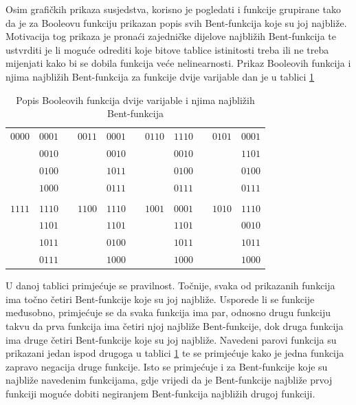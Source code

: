 Osim grafičkih prikaza susjedstva, korisno je pogledati i funkcije grupirane tako da je za Booleovu funkciju prikazan popis svih Bent-funkcija koje su joj najbliže.
Motivacija tog prikaza je pronaći zajedničke dijelove najbližih Bent-funkcija te ustvrditi je li moguće odrediti koje bitove tablice istinitosti treba ili ne treba mijenjati kako bi se dobila funkcija veće nelinearnosti.
Prikaz Booleovih funkcija i njima najbližih Bent-funkcija za funkcije dvije varijable dan je u tablici \ref{tbl:neighbor}
\begin{table}[]
\centering
\begin{tabular}{ccccccccccc}
$0000$ & $0001$ &  & $0011$ & $0001$ &  & $0110$ & $1110$ &  & $0101$ & $0001$ \\
       & $0010$ &  &        & $0010$ &  &        & $0010$ &  &        & $1101$ \\
       & $0100$ &  &        & $1011$ &  &        & $0100$ &  &        & $0100$ \\
       & $1000$ &  &        & $0111$ &  &        & $0111$ &  &        & $0111$ \\
       &        &  &        &        &  &        &        &  &        &        \\
$1111$ & $1110$ &  & $1100$ & $1110$ &  & $1001$ & $0001$ &  & $1010$ & $1110$ \\
       & $1101$ &  &        & $1101$ &  &        & $1101$ &  &        & $0010$ \\
       & $1011$ &  &        & $0100$ &  &        & $1011$ &  &        & $1011$ \\
       & $0111$ &  &        & $1000$ &  &        & $1000$ &  &        & $1000$ \\
\end{tabular}
\caption{Popis Booleovih funkcija dvije varijable i njima najbližih Bent-funkcija}
\label{tbl:neighbor}
\end{table}
U danoj tablici primjećuje se pravilnost.
Točnije, svaka od prikazanih funkcija ima točno četiri Bent-funkcije koje su joj najbliže.
Usporede li se funkcije međusobno, primjećuje se da svaka funkcija ima par, odnosno drugu funkciju takvu da prva funkcija ima četiri njoj najbliže Bent-funkcije, dok druga funkcija ima druge četiri Bent-funkcije koje su joj najbliže.
Navedeni parovi funkcija su prikazani jedan ispod drugoga u tablici \ref{tbl:neighbor} te se primjećuje kako je jedna funkcija zapravo negacija druge funkcije.
Isto se primjećuje i za Bent-funkcije koje su najbliže navedenim funkcijama, gdje vrijedi da je Bent-funkcije najbliže prvoj funkciji moguće dobiti negiranjem Bent-funkcija najbližih drugoj funkciji.
